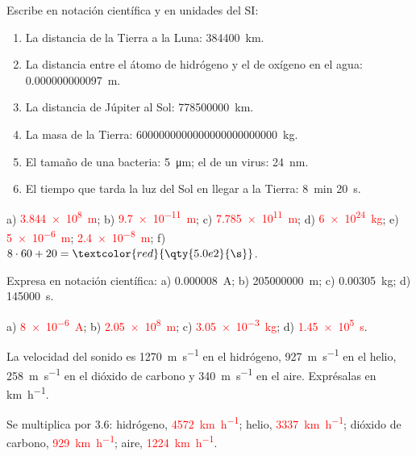 \begin{exercise}
    Escribe en notación científica y en unidades del SI:
    \begin{enumerate}[label=\alph*)]
        \item La distancia de la Tierra a la Luna: \qty{384400}{\km}.
        \item La distancia entre el átomo de hidrógeno y el de oxígeno en el agua: \qty{0.000000000097}{\m}.
        \item La distancia de Júpiter al Sol: \qty{778500000}{\km}.
        \item La masa de la Tierra: \qty{6000000000000000000000000}{\kg}.
        \item El tamaño de una bacteria: \qty{5}{\um}; el de un virus: \qty{24}{\nm}.
        \item El tiempo que tarda la luz del Sol en llegar a la Tierra: \qty{8}{\minute} \qty{20}{\s}.
    \end{enumerate}
    \begin{solu}
        a) \textcolor{red}{\qty{3.844e8}{\m}}; b) \textcolor{red}{\qty{9.7e-11}{\m}}; c) \textcolor{red}{\qty{7.785e11}{\m}}; d) \textcolor{red}{\qty{6e24}{\kg}}; e) \textcolor{red}{\qty{5e-6}{\m}}; \textcolor{red}{\qty{2.4e-8}{\m}}; f) \(8 \cdot 60 + 20 = \textcolor{red}{\qty{5.0e2}{\s}}\).
    \end{solu}
\end{exercise}

\begin{exercise}
    Expresa en notación científica: a) \qty{0.000008}{\ampere}; b) \qty{205000000}{\m}; c) \qty{0.00305}{\kg}; d) \qty{145000}{\s}.
    \begin{solu}
        a) \textcolor{red}{\qty{8e-6}{\ampere}}; b) \textcolor{red}{\qty{2.05e8}{\m}}; c) \textcolor{red}{\qty{3.05e-3}{\kg}}; d) \textcolor{red}{\qty{1.45e5}{\s}}.
    \end{solu}
\end{exercise}

\begin{exercise}
    La velocidad del sonido es \qty{1270}{\m\per\s} en el hidrógeno, \qty{927}{\m\per\s} en el helio, \qty{258}{\m\per\s} en el dióxido de carbono y \qty{340}{\m\per\s} en el aire. Exprésalas en \unit{\km\per\hour}.
    \begin{solu}
        Se multiplica por \num{3.6}: hidrógeno, \textcolor{red}{\qty{4572}{\km\per\hour}}; helio, \textcolor{red}{\qty{3337}{\km\per\hour}}; dióxido de carbono, \textcolor{red}{\qty{929}{\km\per\hour}}; aire, \textcolor{red}{\qty{1224}{\km\per\hour}}.
    \end{solu}
\end{exercise}

